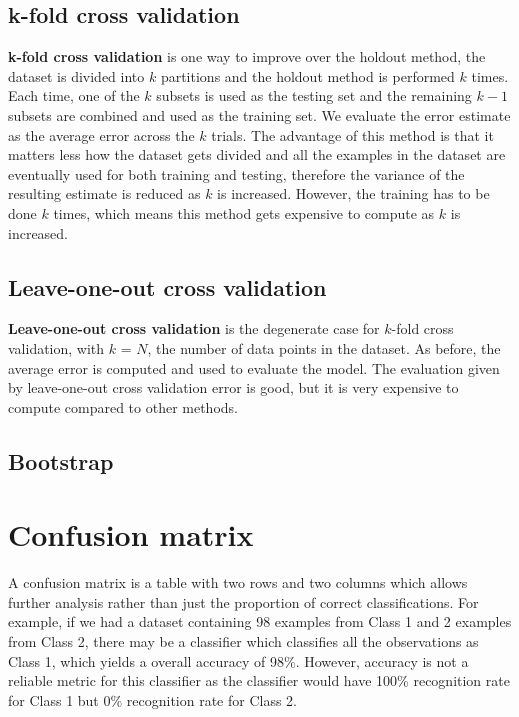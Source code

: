 \documentclass[11pt,fleqn]{book} %
\begin{document}
\subsection{k-fold cross validation}
\textbf{k-fold cross validation} is one way to improve over the holdout method, the dataset is divided into $k$ partitions and the holdout method is performed $k$ times. Each time, one of the $k$ subsets is used as the testing set and the remaining $k - 1$ subsets are combined and used as the training set. We evaluate the error estimate as the average error across the $k$ trials. The advantage of this method is that it matters less how the dataset gets divided and all the examples in the dataset are eventually used for both training and testing, therefore the variance of the resulting estimate is reduced as $k$ is increased. However, the training has to be done $k$ times, which means this method gets expensive to compute as $k$ is increased.

\subsection{Leave-one-out cross validation}
\textbf{Leave-one-out cross validation} is the degenerate case for $k$-fold cross validation, with $k$ = $N$, the number of data points in the dataset. As before, the average error is computed and used to evaluate the model. The evaluation given by leave-one-out cross validation error is good, but it is very expensive to compute compared to other methods.

\subsection{Bootstrap}

\section{Confusion matrix}
A confusion matrix is a table with two rows and two columns which allows further analysis rather than just the proportion of correct classifications. For example, if we had a dataset containing 98 examples from Class 1 and 2 examples from Class 2, there may be a classifier which classifies all the observations as Class 1, which yields a overall accuracy of 98\%. However, accuracy is not a reliable metric for this classifier as the classifier would have 100\% recognition rate for Class 1 but 0\% recognition rate for Class 2.\\
\end{document}
